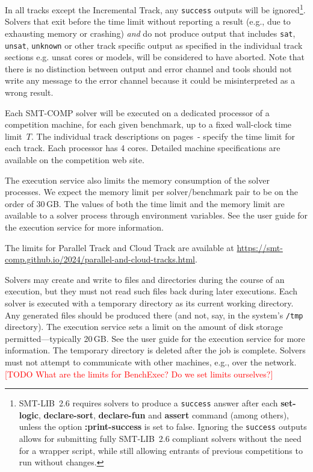 \documentclass[12pt]{article}
\newcommand{\akey}[1]{\textbf{#1}\xspace}
\newcommand{\rem}[1]{\textcolor{red}{[#1]}}
\newcommand{\todo}[1]{\rem{TODO #1}}
\newcommand{\inctrack}{Incremental Track\xspace}
\newcommand{\paralleltrack}{Parallel Track\xspace}
\newcommand{\cloudtrack}{Cloud Track\xspace}
\newcommand{\executionservice}{execution service\xspace}
\begin{document}
%
In all tracks except the \inctrack, any \texttt{success} outputs will be
ignored\footnote{SMT-LIB~2.6 requires solvers to produce a \texttt{success}
  answer after each \akey{set-logic}, \akey{declare-sort}, \akey{declare-fun}
  and \akey{assert} command (among others), unless the option
  \akey{:print-success} is set to false.  Ignoring the \texttt{success} outputs
  allows for submitting fully SMT-LIB~2.6 compliant solvers without the need for
  a wrapper script, while still allowing entrants of previous competitions to
  run without changes.}.  Solvers that exit before the time limit without
reporting a result (e.g., due to exhausting memory or crashing) \emph{and} do
not produce output that includes \texttt{sat}, \texttt{unsat}, \texttt{unknown}
or other track specific output as specified in the individual track sections
e.g. unsat cores or models, will be considered to have aborted.  Note that there
is no distinction between output and error channel and tools should not write
any message to the error channel because it could be misinterpreted as a wrong
result.

%
Each SMT-COMP solver will be executed on a dedicated processor of a
competition machine, for each given benchmark, up to a fixed
wall-clock time limit~$T$. The individual track descriptions on
pages~\pageref{sec:exec:single}-\pageref{sec:exec:model} specify
the time limit for each track. Each processor has 4 cores.  Detailed
machine specifications are available on the competition web site.

The \executionservice also limits the memory consumption of the solver
processes.  We expect the memory limit per solver/benchmark pair to be
on the order of 30\,GB.  The values of both the time limit and the
memory limit are available to a solver process through environment
variables.  See the user guide for the \executionservice for more information.

The limits for \paralleltrack{} and \cloudtrack{} are available at
\url{https://smt-comp.github.io/2024/parallel-and-cloud-tracks.html}.

%
Solvers may create and write to files and directories during the
course of an execution, but they must not read such files back during
later executions.  Each solver is executed with a temporary directory
as its current working directory.  Any generated files should be
produced there (and not, say, in the system's \texttt{/tmp}
directory).  The \executionservice sets a limit on the amount of disk
storage permitted---typically 20\,GB.  See the user guide for the
\executionservice for more information.  The temporary directory is
deleted after the job is complete.  Solvers must not attempt to
communicate with other machines, e.g., over the network.
\todo{What are the limits for BenchExec? Do we set limits ourselves?}
\end{document}
